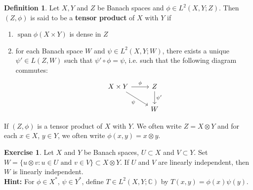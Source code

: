 \documentclass[12pt]{amsart}
\theoremstyle{definition}
\newtheorem{defn}[definition]{Definition}
\newtheorem{ex}[definition]{Exercise}
\newcommand{\C}{\mathbb{C}}
\newcommand{\tbf}[1]{\textbf{#1}}
\DeclareMathOperator{\spn}{span}
\DeclareMathOperator*{\0}{\mbf{0}}
\DeclareMathOperator*{\1}{\mbf{1}}
\begin{document}
	\begin{defn}
	Let $X, Y$ and $Z$ be Banach spaces and $\phi \in L^2(X,Y ; Z) $. Then $(Z, \phi)$ is said to be a \tbf{tensor product} of $X$ with $Y$ if 
	\begin{enumerate}
	\item $\spn \phi(X \times Y)$ is dense in $Z$
	\item for each Banach space $W$ and $\psi \in L^2(X,Y;W)$, there exists a unique $\psi' \in L(Z, W)$ such that $\psi' \circ \phi = \psi$, i.e. such that the following diagram commutes: 
	\[ \begin{tikzcd}
	X \times Y \arrow[r, "\phi"] \arrow[dr, "\psi"'] 	
	& Z  \arrow[d, "\psi'"] \\
	& W 
\end{tikzcd}
	\]
	\end{enumerate}
	If $(Z, \phi)$ is a tensor product of $X$ with $Y$. We often write $Z = X \otimes Y$ and for each $x\in X$, $y \in Y$, we often write $\phi(x,y) = x \otimes y$.
	\end{defn}	
	
	\begin{ex}
	Let $X$ and $Y$ be Banach spaces, $U \subset X$ and $V \subset Y$. Set $W = \{u \otimes v: u \in U \text{ and } v \in V\} \subset X \otimes Y$. If $U$ and $V$ are linearly independent, then $W$ is linearly independent.\\
	\tbf{Hint:} For $\phi \in X^*$, $\psi \in Y^*$, define $T \in L^2(X, Y; \C)$ by $T(x,y) = \phi(x)\psi(y)$.
	\end{ex}	
	
\end{document}
